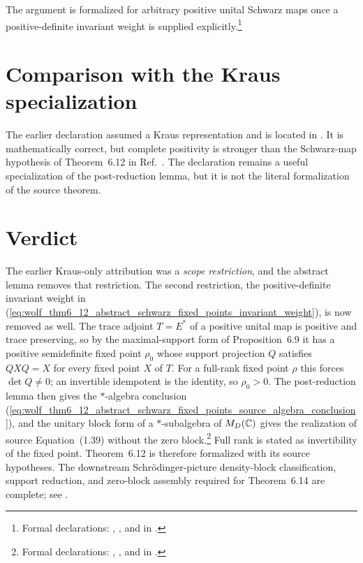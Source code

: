 \documentclass{article}
\begin{document}
The argument is formalized for arbitrary positive unital Schwarz maps once a
positive-definite invariant weight is supplied explicitly.\footnote{Formal
declarations:
,
, and
 in
.}

\section{Comparison with the Kraus specialization}

The earlier declaration
 assumed a Kraus representation and is
located in
. It is mathematically correct, but
complete positivity is stronger than the Schwarz-map hypothesis of
Theorem~6.12 in Ref.~\cite{Wolf2012Quantum}. The declaration remains a useful
specialization of the post-reduction lemma, but it is not the literal
formalization of the source theorem.

\section{Verdict}

The earlier Kraus-only attribution was a \emph{scope restriction}, and the
abstract lemma removes that restriction. The second restriction, the
positive-definite invariant weight in
(\ref{eq:wolf_thm6_12_abstract_schwarz_fixed_points_invariant_weight}), is now
removed as well. The trace adjoint $T=E^*$ of a positive unital map is
positive and trace preserving, so by the maximal-support form of
Proposition~6.9 \cite{Wolf2012Quantum} it has a positive semidefinite fixed
point $\rho_0$ whose support projection $Q$ satisfies $QXQ=X$ for every fixed
point $X$ of $T$. For a full-rank fixed point $\rho$ this forces $\det Q\ne0$;
an invertible idempotent is the identity, so $\rho_0>0$. The post-reduction
lemma then gives the $*$-algebra conclusion
(\ref{eq:wolf_thm6_12_abstract_schwarz_fixed_points_source_algebra_conclusion}),
and the unitary block form of a $*$-subalgebra of $M_{D}(\mathbb{C})$ gives the
realization of source Equation~(1.39) without the zero block.\footnote{Formal
declarations:
,
, and
in .} Full rank
is stated as invertibility of the fixed point. Theorem~6.12 is therefore
formalized with its source hypotheses. The downstream
Schr{\"o}dinger-picture density-block classification, support reduction, and
zero-block assembly required for Theorem~6.14 are complete; see
.



\end{document}
